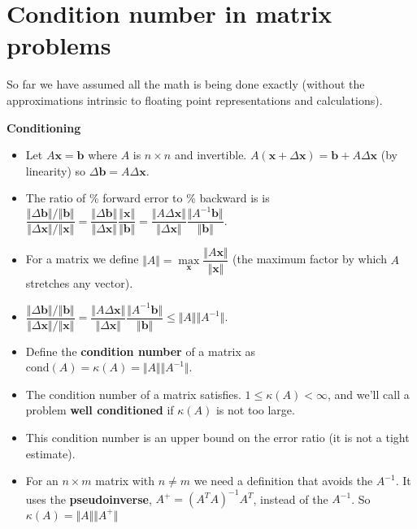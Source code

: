 \documentclass[12pt,letterpaper,noanswers]{exam}
\newcommand{\vc}[1]{\boldsymbol{#1}}
\begin{document}
\section{Condition number in matrix problems}

So far we have assumed all the math is being done exactly (without the approximations intrinsic to floating point representations and calculations).

\vspace{0.2cm}

\noindent\textbf{Conditioning}
\begin{tcolorbox}
\begin{itemize}
\itemsep0pt
\item Let $A\vc{x} = \vc{b}$ where $A$ is $n\times n$ and invertible.  $A(\vc{x} + \Delta\vc{x}) = \vc{b} + A\Delta\vc{x}$ (by linearity) so $\Delta\vc{b} = A\Delta\vc{x}$.
    \item The ratio of \% forward error to \% backward is is $\dfrac{\Vert \Delta \vc{b}\Vert/\Vert\vc{b}\Vert}{\Vert \Delta \vc{x}\Vert/\Vert\vc{x}\Vert} = \dfrac{\Vert \Delta \vc{b}\Vert}{\Vert\Delta\vc{x}\Vert}\dfrac{\Vert \vc{x}\Vert}{\Vert\vc{b}\Vert} = \dfrac{\Vert A\Delta \vc{x}\Vert}{\Vert\Delta\vc{x}\Vert}\dfrac{\Vert A^{-1}\vc{b}\Vert}{\Vert\vc{b}\Vert}$.  
   
   \end{itemize} 
 \end{tcolorbox}   
 \begin{tcolorbox}
   \begin{itemize}
\itemsep0pt
 \item For a matrix we define $\Vert A\Vert = \max\limits_{\vc{x}}\dfrac{\Vert A\vc{x}\Vert}{\Vert\vc{x}\Vert}$ (the maximum factor by which $A$ stretches any vector).
   \item  $\dfrac{\Vert \Delta \vc{b}\Vert/\Vert\vc{b}\Vert}{\Vert \Delta \vc{x}\Vert/\Vert\vc{x}\Vert} = \dfrac{\Vert A\Delta \vc{x}\Vert}{\Vert\Delta\vc{x}\Vert}\dfrac{\Vert A^{-1}\vc{b}\Vert}{\Vert\vc{b}\Vert}\leq \Vert A\Vert \Vert A^{-1}\Vert$.
   \item  Define the \textbf{condition number} of a matrix as $\text{cond}(A) = \kappa(A) =\Vert A\Vert\Vert A^{-1}\Vert$.
   \item The condition number of a matrix satisfies.  $1\leq \kappa(A) < \infty$, and we'll call a problem \textbf{well conditioned} if $\kappa(A)$ is not too large.
   \item This condition number is an upper bound on the error ratio (it is not a tight estimate). 
   \item For an $n\times m$ matrix with $n
   \neq m$ we need a definition that avoids the $A^{-1}$.  It uses the \textbf{pseudoinverse}, $A^+ = (A^TA)^{-1}A^T$, instead of the $A^{-1}$.  So $\kappa(A) = \Vert A\Vert\Vert A^+\Vert$
\end{itemize}
\end{tcolorbox}
\end{document}
